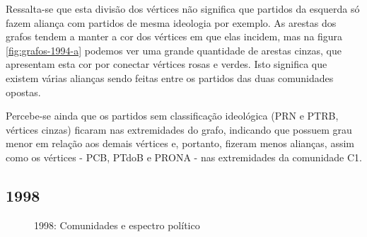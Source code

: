 Ressalta-se que esta divisão dos vértices não significa que partidos da esquerda só fazem aliança com partidos de mesma ideologia por exemplo. As arestas dos grafos tendem a manter a cor dos vértices em que elas incidem, mas na figura \ref{fig:grafos-1994-a} podemos ver uma grande quantidade de arestas cinzas, que apresentam esta cor por conectar vértices rosas e verdes. Isto significa que existem várias alianças sendo feitas entre os partidos das duas comunidades opostas.

Percebe-se ainda que os partidos sem classificação ideológica (\gls{PRN} e \gls{PTRB}, vértices cinzas) ficaram nas extremidades do grafo, indicando que possuem grau menor em relação aos demais vértices e, portanto, fizeram menos alianças, assim como os vértices - \gls{PCB}, \gls{PTdoB} e \gls{PRONA} - nas extremidades da comunidade C1.


\subsection{1998}
\label{resultados__grafos--1998}

\begin{figure}[H]
\center
    \qquad
    
    \caption{1998: Comunidades e espectro político}
\end{figure}

